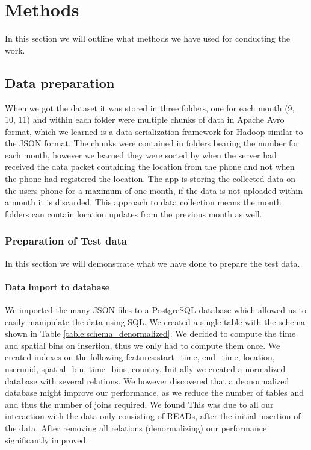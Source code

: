 \chapter{Methods}
\label{chap:methods}

In this section we will outline what methods we have used for conducting the work.
\section{Data preparation}

When we got the dataset it was stored in three folders, one for each month (9, 10, 11) and within each folder were multiple chunks of data in Apache Avro format\cite{apacheavro}, which we learned is a data serialization framework for Hadoop similar to the JSON format. The chunks were contained in folders bearing the number for each month, however we learned they were sorted by when the server had received the data packet containing the location from the phone and not when the phone had registered the location. The app is storing the collected data on the users phone for a maximum of one month, if the data is not uploaded within a month it is discarded. This approach to data collection means the month folders can contain location updates from the previous month as well.


\subsection{Preparation of Test data}
In this section we will demonstrate what we have done to prepare the test data.

\subsubsection{Data import to database}
We imported the many JSON files to a PostgreSQL database which allowed us to easily manipulate the data using SQL. We created a single table with the schema shown in Table \ref{table:schema_denormalized}. We decided to compute the time and spatial bins on insertion, thus we only had to compute them once. We created indexes on the following features:start\_time, end\_time, location, useruuid, spatial\_bin, time\_bins, country.
Initially we created a normalized database with several relations. We however discovered that a deonormalized database might improve our performance, as we reduce the number of tables and and thus the number of joins required\cite{sanders2001denormalization}. We found This was due to all our interaction with the data only consisting of READs, after the initial insertion of the data. After removing all relations (denormalizing) our performance significantly improved.

